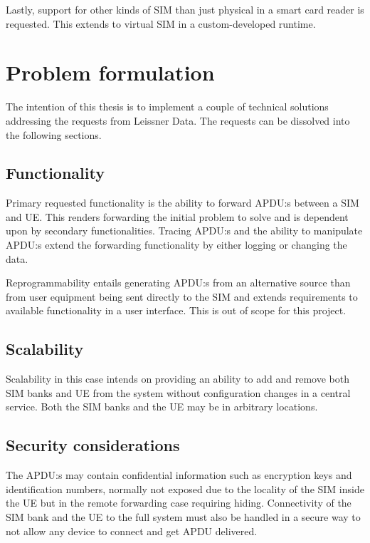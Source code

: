 Lastly, support for other kinds of SIM than just physical in a
smart card reader is requested. This extends to virtual SIM in
a custom-developed runtime.

\section{Problem formulation}
\label{sec:problem-formulation}

The intention of this thesis is to implement a couple of technical
solutions addressing the requests from Leissner Data. The requests
can be dissolved into the following sections.

\subsection{Functionality}

Primary requested functionality is the ability to forward APDU:s
between a SIM and UE. This renders forwarding the initial problem
to solve and is dependent upon by secondary functionalities.
Tracing APDU:s and the ability to manipulate APDU:s extend the
forwarding functionality by either logging or changing the data.

Reprogrammability entails generating APDU:s from an alternative
source than from user equipment being sent directly to the SIM and
extends requirements to available functionality in a user
interface. This is out of scope for this project.

\subsection{Scalability}

Scalability in this case intends on providing an ability to add and
remove both SIM banks and UE from the system without configuration
changes in a central service. Both the SIM banks and the UE may be
in arbitrary locations.

\subsection{Security considerations}

The APDU:s may contain confidential information such as encryption
keys and identification numbers, normally not exposed due to the
locality of the SIM inside the UE but in the remote forwarding case
requiring hiding. Connectivity of the SIM bank and the UE to the
full system must also be handled in a secure way to not allow any
device to connect and get APDU delivered.

